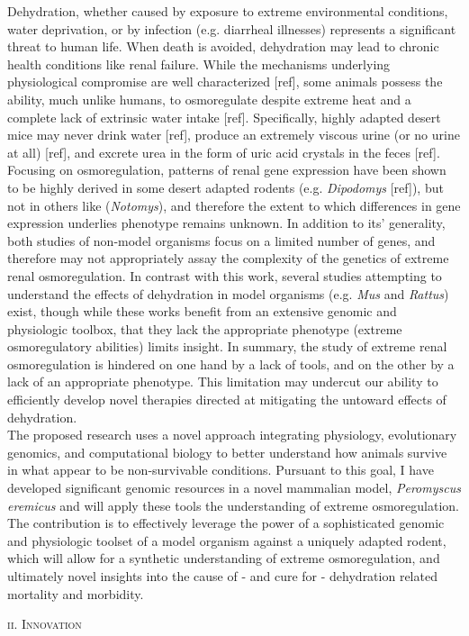 \documentclass[11pt]{article}
\begin{document}
Dehydration, whether caused by exposure to extreme environmental conditions, water deprivation, or by infection (e.g. diarrheal illnesses) represents a significant threat to human life. When death is avoided, dehydration may lead to chronic health conditions like renal failure. While the mechanisms underlying physiological compromise are well characterized [ref], some animals possess the ability, much unlike humans, to osmoregulate despite extreme heat and a complete lack of extrinsic water intake [ref]. Specifically, highly adapted desert mice may never drink water [ref], produce an extremely viscous urine (or no urine at all) [ref], and excrete urea in the form of uric acid crystals in the feces [ref]. Focusing on osmoregulation, patterns of renal gene expression have been shown to be highly derived in some desert adapted rodents (e.g. \textit{Dipodomys} [ref]), but not in others like (\textit{Notomys}), and therefore the extent to which differences in gene expression underlies phenotype remains unknown. In addition to its' generality, both studies of non-model organisms focus on a limited number of genes, and therefore may not appropriately assay the complexity of the genetics of extreme renal osmoregulation. In contrast with this work, several studies attempting to understand the effects of dehydration in model organisms (e.g. \textit{Mus} and \textit{Rattus}) exist, though while these works benefit from an extensive genomic and physiologic toolbox, that they lack the appropriate phenotype (extreme osmoregulatory abilities) limits insight. In summary, the study of extreme renal osmoregulation is hindered on one hand by a lack of tools, and on the other by a lack of an appropriate phenotype. This limitation may undercut our ability to efficiently develop novel therapies directed at mitigating the untoward effects of dehydration. \\

The proposed research uses a novel approach integrating physiology, evolutionary genomics, and computational biology to better understand how animals survive in what appear to be non-survivable conditions. Pursuant to this goal, I have developed significant genomic resources in a novel mammalian model, \textit{Peromyscus eremicus} and will apply these tools the understanding of extreme osmoregulation. The contribution is to effectively leverage the power of a sophisticated genomic and physiologic toolset of a model organism against a uniquely adapted rodent, which will allow for a synthetic understanding of extreme osmoregulation, and ultimately novel insights into the cause of - and cure for - dehydration related mortality and morbidity.
\normalsize 
\begin{center}
\textsc{{ii. Innovation}} \\
\end{center}
\end{document}
